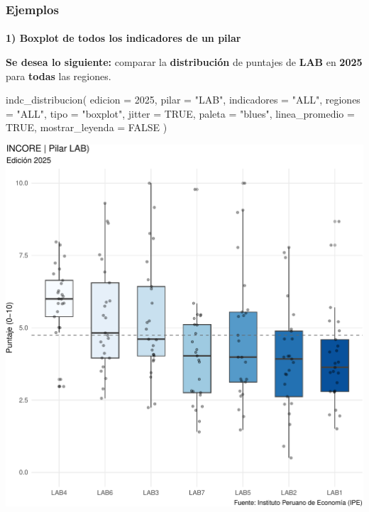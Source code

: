 \documentclass[
  11pt,
  letterpaper,
  DIV=11,
  numbers=noendperiod]{scrartcl}
\makeatletter
\let\oldparagraph\paragraph
\renewcommand{\paragraph}{
    \@ifstar
      \xxxParagraphStar
      \xxxParagraphNoStar
  }
\newcommand{\xxxParagraphStar}[1]{\oldparagraph*{#1}\mbox{}}
\newcommand{\xxxParagraphNoStar}[1]{\oldparagraph{#1}\mbox{}}
\newenvironment{Shaded}{\begin{snugshade}}{\end{snugshade}}
\newcommand{\AttributeTok}[1]{\textcolor[rgb]{0.40,0.45,0.13}{#1}}
\newcommand{\ConstantTok}[1]{\textcolor[rgb]{0.56,0.35,0.01}{#1}}
\newcommand{\DecValTok}[1]{\textcolor[rgb]{0.68,0.00,0.00}{#1}}
\newcommand{\FunctionTok}[1]{\textcolor[rgb]{0.28,0.35,0.67}{#1}}
\newcommand{\NormalTok}[1]{\textcolor[rgb]{0.00,0.23,0.31}{#1}}
\newcommand{\StringTok}[1]{\textcolor[rgb]{0.13,0.47,0.30}{#1}}
\makeatother
\begin{document}
\subsubsection{\texorpdfstring{\textbf{Ejemplos}}{Ejemplos}}\label{ejemplos-15}

\paragraph{\texorpdfstring{\textbf{1) Boxplot de todos los indicadores
de un
pilar}}{1) Boxplot de todos los indicadores de un pilar}}\label{boxplot-de-todos-los-indicadores-de-un-pilar}

\textbf{Se desea lo siguiente:} comparar la \textbf{distribución} de
puntajes de \textbf{LAB} en \textbf{2025} para \textbf{todas} las
regiones.

\begin{Shaded}
\begin{Highlighting}[]
\FunctionTok{indc\_distribucion}\NormalTok{(}
  \AttributeTok{edicion         =} \DecValTok{2025}\NormalTok{,}
  \AttributeTok{pilar           =} \StringTok{"LAB"}\NormalTok{,}
  \AttributeTok{indicadores     =} \StringTok{"ALL"}\NormalTok{,}
  \AttributeTok{regiones        =} \StringTok{"ALL"}\NormalTok{,}
  \AttributeTok{tipo            =} \StringTok{"boxplot"}\NormalTok{,}
  \AttributeTok{jitter          =} \ConstantTok{TRUE}\NormalTok{,}
  \AttributeTok{paleta          =} \StringTok{"blues"}\NormalTok{,}
  \AttributeTok{linea\_promedio  =} \ConstantTok{TRUE}\NormalTok{,}
  \AttributeTok{mostrar\_leyenda =} \ConstantTok{FALSE}
\NormalTok{)}
\end{Highlighting}
\end{Shaded}

\includegraphics{Manual_files/figure-pdf/unnamed-chunk-91-1.pdf}
\end{document}
